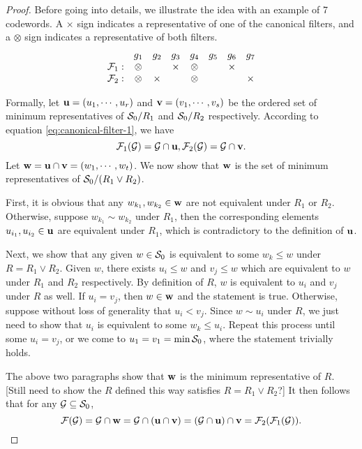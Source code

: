 \begin{proof}
Before going into details, we illustrate the idea with an example of 7 codewords. A $\times$ sign indicates a representative of one of the canonical filters, and a $\otimes$ sign indicates a representative of both filters.
\[
\begin{array}{r c c c c c c c }
      & g_1 & g_2 & g_3 & g_4 & g_5 & g_6 & g_7 \\
\mathcal{F}_1: & \otimes &        & \times & \otimes & & \times & \\
\mathcal{F}_2: & \otimes & \times &        & \otimes & &        & \times
\end{array}
\]

Formally, let $\mathbf{u} = (u_1, \cdots, u_r)$ and $\mathbf{v} = (v_1, \cdots, v_s)$ be the ordered set of minimum representatives of $\mathcal{S}_0 / R_1$ and $\mathcal{S}_0 / R_2$ respectively. According to equation \eqref{eq:canonical-filter-1}, we have
\[
\mathcal{F}_1(\mathcal{G}) = \mathcal{G} \cap \mathbf{u}, \mathcal{F}_2(\mathcal{G}) = \mathcal{G} \cap \mathbf{v}.
\]
Let $\mathbf{w} = \mathbf{u} \cap \mathbf{v} = (w_1, \cdots, w_t)$. We now show that $\mathbf{w}$ is the set of minimum representatives of $\mathcal{S}_0 / (R_1 \vee R_2)$.

First, it is obvious that any $w_{k_1}, w_{k_2} \in \mathbf{w}$ are not equivalent under $R_1$ or $R_2$. Otherwise, suppose $w_{k_1} \sim w_{k_2}$ under $R_1$, then the corresponding elements $u_{i_1}, u_{i_2} \in \mathbf{u}$ are equivalent under $R_1$, which is contradictory to the definition of $\mathbf{u}$.

Next, we show that any given $w \in \mathcal{S}_0$ is equivalent to some $w_k \le w$ under $R = R_1 \vee R_2$. Given $w$, there exists $u_i \le w$ and $v_j \le w$ which are equivalent to $w$ under $R_1$ and $R_2$ respectively. By definition of $R$, $w$ is equivalent to $u_i$ and $v_j$ under $R$ as well. If $u_i = v_j$, then $w \in \mathbf{w}$ and the statement is true. Otherwise, suppose without loss of generality that $u_i < v_j$. Since $w \sim u_i$ under $R$, we just need to show that $u_i$ is equivalent to some $w_k \le u_i$. Repeat this process until some $u_i = v_j$, or we come to $u_1 = v_1 = \min \mathcal{S}_0$, where the statement trivially holds.

The above two paragraphs show that $\mathbf{w}$ is the minimum representative of $R$. [Still need to show the $R$ defined this way satisfies $R = R_1 \vee R_2$?] It then follows that for any $\mathcal{G} \subseteq \mathcal{S}_0$,
\[
\mathcal{F}(\mathcal{G}) = \mathcal{G} \cap \mathbf{w} = \mathcal{G} \cap (\mathbf{u} \cap \mathbf{v} ) = (\mathcal{G} \cap \mathbf{u}) \cap \mathbf{v}
= \mathcal{F}_2(\mathcal{F}_1(\mathcal{G})) .
\]

\end{proof}


